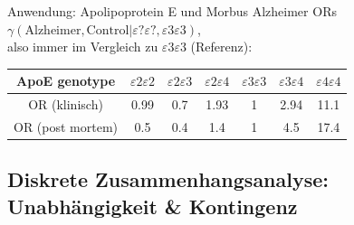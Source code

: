 \documentclass[
  10pt,
  ignorenonframetext,
]{beamer}
\begin{document}
\begin{frame}{Anwendung: Apolipoprotein E und Morbus Alzheimer}
\protect\hypertarget{anwendung-apolipoprotein-e-und-morbus-alzheimer-1}{}
ORs
\(\gamma(\text{Alzheimer}, \text{Control} | \varepsilon{?}\varepsilon{?}, \varepsilon 3\varepsilon 3)\),\\
also immer im Vergleich zu \(\varepsilon3\varepsilon3\) (Referenz):

\vspace{0.5cm}

\begin{tabular}{c|c c c c c c }
  ApoE genotype   & $\varepsilon2\varepsilon2$ & $\varepsilon2\varepsilon3$   & $\varepsilon2\varepsilon4$
  & $\varepsilon3\varepsilon3$  & $\varepsilon3\varepsilon4$ & $\varepsilon4\varepsilon4$ \\\hline 
  OR (klinisch) & 0.99 & 0.7 & 1.93 & 1 & 2.94 & 11.1 \\ 
  OR (post mortem) & 0.5 & 0.4 & 1.4 & 1 & 4.5 & 17.4 \\ 
\end{tabular}
\end{frame}

\hypertarget{diskrete-zusammenhangsanalyse-unabhuxe4ngigkeit-kontingenz}{%
\subsection{Diskrete Zusammenhangsanalyse: Unabhängigkeit \&
Kontingenz}\label{diskrete-zusammenhangsanalyse-unabhuxe4ngigkeit-kontingenz}}
\end{document}
